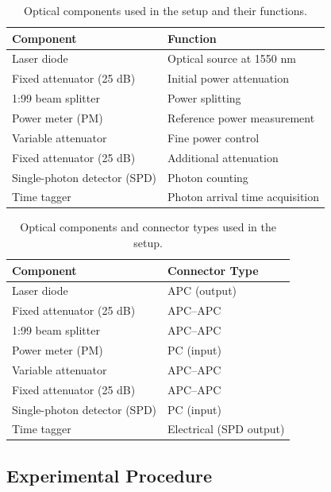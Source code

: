 \begin{table}[h]
  \centering
  \begin{tabular}{ll}
    \toprule
    \textbf{Component} & \textbf{Function}  \\
    \midrule
    Laser diode & Optical source at 1550 nm  \\
    Fixed attenuator (25 dB) & Initial power attenuation  \\
    1:99 beam splitter & Power splitting  \\
    Power meter (PM) & Reference power measurement  \\
    Variable attenuator & Fine power control  \\
    Fixed attenuator (25 dB) & Additional attenuation \\
    Single-photon detector (SPD) & Photon counting  \\
    Time tagger & Photon arrival time acquisition  \\
    \bottomrule
  \end{tabular}
  \caption{Optical components used in the setup and their functions.}
  \label{tab:component_function}
\end{table}

\begin{table}[h]
  \centering
  \begin{tabular}{ll}
    \toprule
    \textbf{Component} & \textbf{Connector Type} \\
    \midrule
    Laser diode & APC (output) \\
    Fixed attenuator (25 dB)  & APC--APC \\
    1:99 beam splitter & APC--APC \\
    Power meter (PM)  & PC (input) \\
    Variable attenuator  & APC--APC \\
    Fixed attenuator (25 dB)  & APC--APC \\
    Single-photon detector (SPD)  & PC (input) \\
    Time tagger  & Electrical (SPD output) \\
    \bottomrule
  \end{tabular}
  \caption{Optical components and connector types used in the setup.}
  \label{tab:component_connector}
\end{table}

\subsection{Experimental Procedure}


